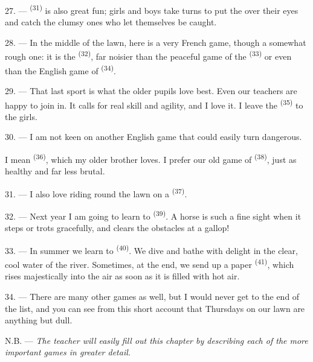 27. ---  \textsuperscript{(31)} is also great fun; girls and boys
take turns to put the  over their eyes and catch the clumsy ones who let
themselves be caught.

28. --- In the middle of the lawn, here is a very French game, though a somewhat rough one: it
is the  \textsuperscript{(32)}, far noisier than the peaceful game of the
 \textsuperscript{(33)} or even than the English game of 
\textsuperscript{(34)}.

29. --- That last sport is what the older pupils love best. Even our teachers are happy to
join in. It calls for real skill and agility, and I love it. I leave the 
\textsuperscript{(35)} to the girls.

30. --- I am not keen on another English game that could easily turn dangerous.

I mean  \textsuperscript{(36)}, which my older brother loves. I prefer our
old game of  \textsuperscript{(38)}, just as healthy and far less
brutal.

\VUsaut{4.6mm}
\VUsaut{3.0mm}

31. --- I also love riding round the lawn on a  \textsuperscript{(37)}.

32. --- Next year I am going to learn to  \textsuperscript{(39)}. A horse is such
a fine sight when it steps or trots gracefully, and clears the obstacles at a gallop!

33. --- In summer we learn to  \textsuperscript{(40)}. We dive and bathe with
delight in the clear, cool water of the river. Sometimes, at the end, we send up a paper
 \textsuperscript{(41)}, which rises majestically into the air as soon as it
is filled with hot air.

34. --- There are many other games as well, but I would never get to the end of the list, and
you can see from this short account that Thursdays on our lawn are anything but dull.

N.B. --- \textit{The teacher will easily fill out this chapter by describing each of the more
important games in greater detail.}
\VUsaut{6.0mm}
\VUfilet{22mm}
